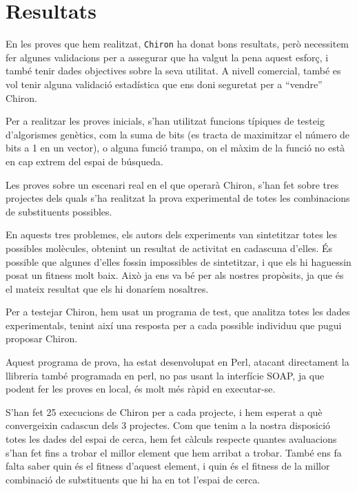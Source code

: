 \section{Resultats} %
	\label{sec:Resultats}

	En les proves que hem realitzat, \texttt{Chiron} ha donat bons resultats,
	però necessitem fer algunes validacions per a assegurar que ha valgut la
	pena aquest esforç, i també tenir dades objectives sobre la seva utilitat.
	A nivell comercial, també es vol tenir alguna validació estadística que ens
	doni seguretat per a ``vendre'' Chiron.

	Per a realitzar les proves inicials, s'han utilitzat funcions típiques de
	testeig d'algorismes genètics, com la suma de bits (es tracta de maximitzar
	el número de bits a 1 en un vector), o alguna funció trampa, on el màxim de
	la funció no està en cap extrem del espai de búsqueda.

	Les proves sobre un escenari real en el que operarà Chiron, s'han fet sobre
	tres projectes dels quals s'ha realitzat la prova experimental de totes les
	combinacions de substituents possibles. 

	En aquests tres problemes, els autors dels experiments van sintetitzar totes
	les possibles molècules, obtenint un resultat de activitat en cadascuna
	d'elles.  És possible que algunes d'elles fossin impossibles de sintetitzar,
	i que els hi haguessin posat un fitness molt baix.  Això ja ens va bé per
	als nostres propòsits, ja que és el mateix resultat que els hi donaríem
	nosaltres.

	Per a testejar Chiron, hem usat un programa de test, que analitza totes les
	dades experimentals, tenint així una resposta per a cada possible individuu
	que pugui proposar Chiron.

	Aquest programa de prova, ha estat desenvolupat en Perl, atacant directament
	la llibreria també programada en perl, no pas usant la interfície SOAP, ja
	que podent fer les proves en local, és molt més ràpid en executar-se.

	S'han fet 25 execucions de Chiron per a cada projecte, i hem
	esperat a què convergeixin cadascun dels 3 projectes.  Com que tenim a la
	nostra disposició totes les dades del espai de cerca, hem fet càlculs
	respecte quantes avaluacions s'han fet fins a trobar el millor element que
	hem arribat a trobar.  També ens fa falta saber quin és el fitness d'aquest
	element, i quin és el fitness de la millor combinació de substituents que
	hi ha en tot l'espai de cerca. 

